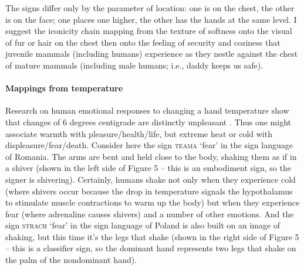 \documentclass[output=paper,
modfonts
]{LSP/langsci}
\begin{document}
The signs differ only by the parameter of location: one is on the chest,
the other is on the face; one places one higher, the other has the hands
at the same level. I suggest the iconicity chain mapping from the
texture of softness onto the visual of fur or hair on the chest then
onto the feeling of security and coziness that juvenile mammals
(including humans) experience as they nestle against the chest of mature
mammals (including male humans; i.e., daddy keeps us safe).

\paragraph{Mappings from temperature} Research on human emotional responses
to changing a hand temperature show that changes of 6 degrees centigrade
are distinctly unpleasant \citep{salminen2013}. Thus one might
associate warmth with pleasure/health/life, but extreme heat or cold
with displeasure/fear/death. Consider here the sign \textsc{teama}
`fear' in the sign language of Romania. The arms are bent and held close
to the body, shaking them as if in a shiver (shown in the left side of
Figure 5 -- this is an embodiment sign, so the signer is shivering).
Certainly, humans shake not only when they experience cold (where
shivers occur because the drop in temperature signals the hypothalamus
to stimulate muscle contractions to warm up the body) but when they
experience fear (where adrenaline causes shivers) and a number of other
emotions. And the sign \textsc{strach} `fear' in the sign language of
Poland is also built on an image of shaking, but this time it's the legs
that shake (shown in the right side of Figure 5 -- this is a classifier
sign, so the dominant hand represents two legs that shake on the palm of
the nondominant hand).
\end{document}
